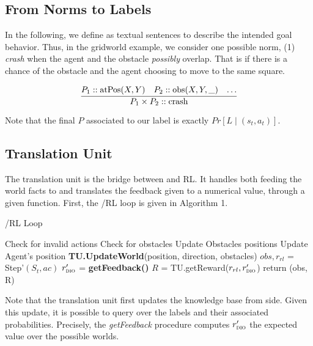 \subsection{From Norms to Labels}
In the following, we define \textbf{} as textual sentences to describe the intended goal behavior. 
Thus, in the gridworld example, we consider one possible norm, (1) \textit{crash} when the agent and the obstacle \emph{possibly} overlap. That is if there is a chance of 
the obstacle and the agent choosing to move to the same square. 

\[
    \infer{P_1 \times P_2 :: \text{crash}}{
      P_1::\text{atPos}(X,Y)
      &
      P_2::\text{obs}(X,Y,\_)
      & 
      \ldots}
\] 

Note that the final $P$ associated to our label is exactly $Pr[L \mid (s_t, a_t)]$. 

\subsection{Translation Unit}

The translation unit is the bridge between \dio{} and RL. It handles both feeding 
the world facts to \dio{} and translates the feedback given to a numerical value, through 
a given function. First, the \dio{}/RL loop is given in Algorithm 1. 

  \begin{algorithm}[H]
    \caption{\dio{}/RL Loop}
    \begin{algorithmic}[1]
    
           
        \State Check for invalid actions
        \State Check for obstacles 
        \State Update Obstacles positions
        \State Update Agent's position
        \State \textbf{TU.UpdateWorld}(position, direction, obstacles) 
        \State $obs, r_{rl}$ = Step'$(S_t, ac)$ 
        \State $r_{\textsc{dio}{}}'$ = \textbf{getFeedback()} 
        \State $R$ = TU.getReward($r_{rl}, r_{\textsc{dio}{}}'$) 
        \State return (obs, R)
    \EndProcedure
    
    \end{algorithmic}
    \end{algorithm}

Note that the translation unit first updates the knowledge base from \dio{} side. 
Given this update, it is possible to query \dio{} over the labels and their associated probabilities. Precisely, 
the \emph{getFeedback} procedure computes $r'_{\textsc{dio}{}}$ the expected value over the possible worlds. 

